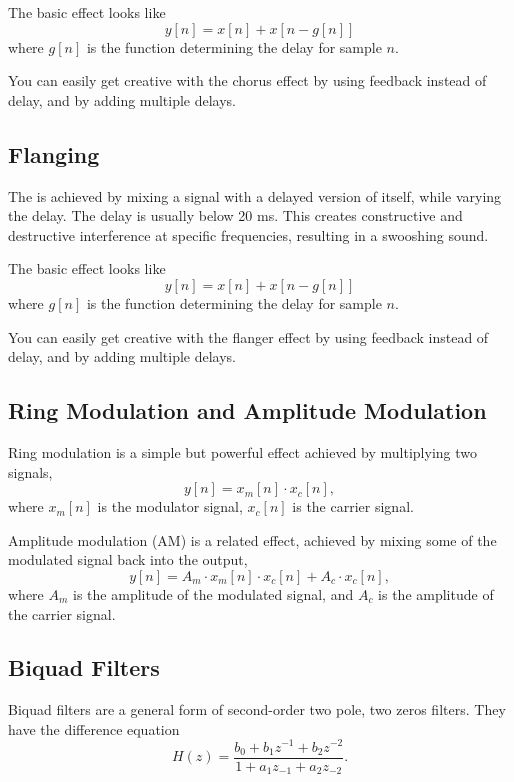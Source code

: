 \documentclass{article}
\def\lsqb{\left[}
\def\rsqb{\right]}
\def\sqb#1{\lsqb #1 \rsqb}
\def\ysig{y\sqb{n}}
\begin{document}
The basic effect looks like
\begin{equation}
	\ysig = x\sqb{n} + x\sqb{n - g\sqb{n}}
\end{equation}
where $g\sqb{n}$ is the function determining the delay for sample $n$.

You can easily get creative with the chorus effect by using feedback instead of delay, and by adding multiple delays.

\subsection{Flanging}
The  is achieved by mixing a signal with a delayed version of itself, while varying the delay. The delay is usually below 20 ms. This creates constructive and destructive interference at specific frequencies, resulting in a swooshing sound.

The basic effect looks like
\begin{equation}
	\ysig = x\sqb{n} + x\sqb{n - g\sqb{n}}
\end{equation}
where $g\sqb{n}$ is the function determining the delay for sample $n$.

You can easily get creative with the flanger effect by using feedback instead of delay, and by adding multiple delays.

\subsection{Ring Modulation and Amplitude Modulation}
Ring modulation is a simple but powerful effect achieved by multiplying two signals,
\begin{equation}
	\ysig = x_m\sqb{n} \cdot x_c\sqb{n},
\end{equation}
where $x_m\sqb{n}$ is the modulator signal, $x_c\sqb{n}$ is the carrier signal. 

Amplitude modulation (AM) is a related effect, achieved by mixing some of the modulated signal back into the output,
\begin{equation}
	\ysig = A_m \cdot x_m\sqb{n} \cdot x_c\sqb{n} + A_c \cdot x_c\sqb{n},
\end{equation}
where $A_m$ is the amplitude of the modulated signal, and $A_c$ is the amplitude of the carrier signal.

\subsection{Biquad Filters}
Biquad filters are a general form of second-order two pole, two zeros filters. They have the difference equation
\begin{equation}
    H(z) = \frac{b_0 + b_1 z^{-1} + b_2 z ^{-2}}{1 + a_1 z_{-1} + a_2 z_{-2}}.
\end{equation}
\end{document}
